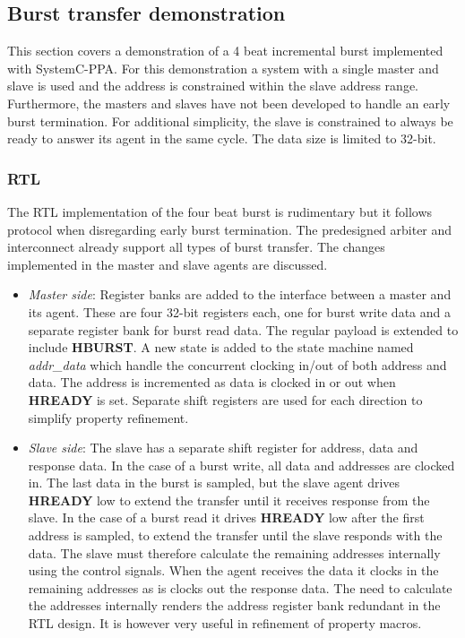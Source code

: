 \subsection{Burst transfer demonstration} 
\label{sub:burstdemo}
This section covers a demonstration of a 4 beat incremental burst implemented with SystemC-PPA. For this demonstration a system with a single master and slave
is used and the address is constrained within the slave address range. Furthermore, the masters and slaves have not been developed to handle an early burst termination. For additional simplicity, the slave is constrained to always be ready to answer its agent in the same cycle. The data size is limited to 32-bit.

\subsubsection{RTL}
The RTL implementation of the four beat burst is rudimentary but it follows protocol when disregarding early burst termination. The predesigned arbiter and interconnect already support all types of burst transfer. The changes implemented in the master and slave agents are discussed.
\begin{itemize}
 \item \textit{Master side}: Register banks are added to the interface between a master and its agent. These are four 32-bit registers each, one for burst write data and a separate register bank for burst read data. The regular payload is extended to include \textbf{HBURST}. A new state is added to the state machine named \textit{addr\_data} which handle the concurrent clocking in/out of both address and data. The address is incremented as data is clocked in or out when \textbf{HREADY} is set. Separate shift registers are used for each direction to simplify property refinement. 
 \item \textit{Slave side}: The slave has a separate shift register for address, data and response data. In the case of a burst write, all data and addresses are clocked in. The last data in the burst is sampled, but the slave agent drives \textbf{HREADY} low to extend the transfer until it receives response from the slave. In the case of a burst read it drives \textbf{HREADY} low after the first address is sampled, to extend the transfer until the slave responds with the data. The slave must therefore calculate the remaining addresses internally using the control signals. When the agent receives the data it clocks in the remaining addresses as is clocks out the response data. The need to calculate the addresses internally renders the address register bank redundant in the RTL design. It is however very useful in refinement of property macros. 
\end{itemize}

